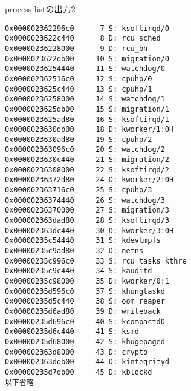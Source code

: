 \begin{itembox}[l]{process-listの出力2}
    \begin{verbatim}
0x000002362296c0      7 S: ksoftirqd/0
0x0000023622c440      8 D: rcu_sched
0x00000236228000      9 D: rcu_bh
0x0000023622db00     10 S: migration/0
0x00000236254440     11 S: watchdog/0
0x000002362516c0     12 S: cpuhp/0
0x0000023625c440     13 S: cpuhp/1
0x00000236258000     14 S: watchdog/1
0x0000023625db00     15 S: migration/1
0x0000023625ad80     16 S: ksoftirqd/1
0x0000023630db00     18 D: kworker/1:0H
0x0000023630ad80     19 S: cpuhp/2
0x000002363096c0     20 S: watchdog/2
0x0000023630c440     21 S: migration/2
0x00000236308000     22 S: ksoftirqd/2
0x00000236372d80     24 D: kworker/2:0H
0x000002363716c0     25 S: cpuhp/3
0x00000236374440     26 S: watchdog/3
0x00000236370000     27 S: migration/3
0x000002363dad80     28 S: ksoftirqd/3
0x000002363dc440     30 D: kworker/3:0H
0x00000235c54440     31 S: kdevtmpfs
0x00000235c9ad80     32 D: netns
0x00000235c996c0     33 S: rcu_tasks_kthre
0x00000235c9c440     34 S: kauditd
0x00000235c98000     35 D: kworker/0:1
0x00000235d596c0     37 S: khungtaskd
0x00000235d5c440     38 S: oom_reaper
0x00000235d6ad80     39 D: writeback
0x00000235d696c0     40 S: kcompactd0
0x00000235d6c440     41 S: ksmd
0x00000235d68000     42 S: khugepaged
0x000002363d8000     43 D: crypto
0x000002363ddb00     44 D: kintegrityd
0x00000235d7db00     45 D: kblockd
以下省略
    \end{verbatim}
\end{itembox}

